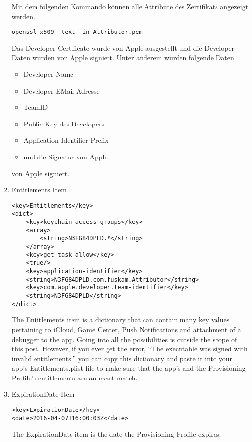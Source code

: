 \begin{enumerate}
Mit dem folgenden Kommando können alle Attribute des Zertifikats angezeigt werden.
\lstset{
    language=bash,
    }
\begin{lstlisting}[caption={openssl command to encode the developer certificate}]
openssl x509 -text -in Attributor.pem 
\end{lstlisting}

 

Das Developer Certificate wurde von Apple ausgestellt und die Developer Daten wurden von Apple signiert.
Unter anderem wurden folgende Daten
\begin{itemize}
    \item Developer Name
    \item Developer EMail-Adresse
    \item TeamID
    \item Public Key des Developers
    \item Application Identifier Prefix
    \item und die Signatur von Apple
\end{itemize}
von Apple signiert.

    \item Entitlements Item
\begin{lstlisting}[caption={Entitlements Item}]
<key>Entitlements</key>
<dict>
    <key>keychain-access-groups</key>
    <array>
        <string>N3FG84DPLD.*</string>           
    </array>
    <key>get-task-allow</key>
    <true/>
    <key>application-identifier</key>
    <string>N3FG84DPLD.com.fuskam.Attributor</string>
    <key>com.apple.developer.team-identifier</key>
    <string>N3FG84DPLD</string>
</dict>
\end{lstlisting}
The Entitlements item is a dictionary that can contain many key values pertaining to iCloud, Game Center, Push Notifications and attachment of a debugger to the app. Going into all the possibilities is outside the scope of this post. However, if you ever get the error, “The executable was signed with invalid entitlements,” you can copy this dictionary and paste it into your app’s Entitlements.plist file to make sure that the app’s and the Provisioning Profile’s entitlements are an exact match.

    \item ExpirationDate Item
\begin{lstlisting}[caption={ExpirationDate Item}]
<key>ExpirationDate</key>
<date>2016-04-07T16:00:03Z</date>
\end{lstlisting}
The ExpirationDate item is the date the Provisioning Profile expires.


\end{enumerate}
